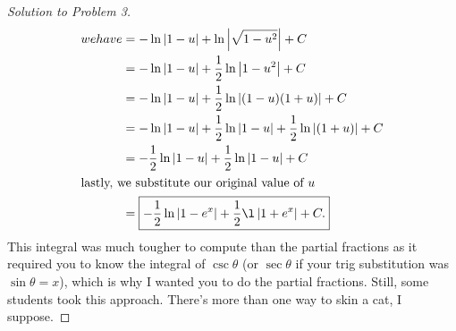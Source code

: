 \documentclass[12pt]{article}
\theoremstyle{plain}
\theoremstyle{definition}
\theoremstyle{remark}
\begin{document}
\begin{proof}[Solution to Problem 3]
\begin{align*}
{  we have }
&=-\ln\left|1-u\right|+\ln\left|\sqrt{1-u^2}\right|+C\\
&=-\ln\left|1-u\right|+\frac{1}{2}\ln\left|1-u^2\right|+C\\
&=-\ln\left|1-u\right|+\frac{1}{2}\ln\left|(1-u)(1+u)\right|+C\\
&=-\ln\left|1-u\right|+\frac{1}{2}\ln\left|1-u\right|
+\frac{1}{2}\ln\left|(1+u)\right|+C\\
&=-\frac{1}{2}\ln\left|1-u\right|+\frac{1}{2}\ln\left|1-u\right|+C\\
\intertext{lastly, we substitute our original value of $u$}
&=\boxed{-\frac{1}{2}\ln\left|1-e^x\right|+\frac{1}{2}\l\left|1+e^x\right|+C.}
\end{align*}
This integral was much tougher to compute than the partial fractions as it
required you to know the integral of $\csc\theta$ (or $\sec\theta$ if your
trig substitution was $\sin\theta=x$), which is why I wanted you to do the
partial fractions. Still, some students took this approach. There's more
than one way to skin a cat, I suppose.
\end{proof}
\end{document}
